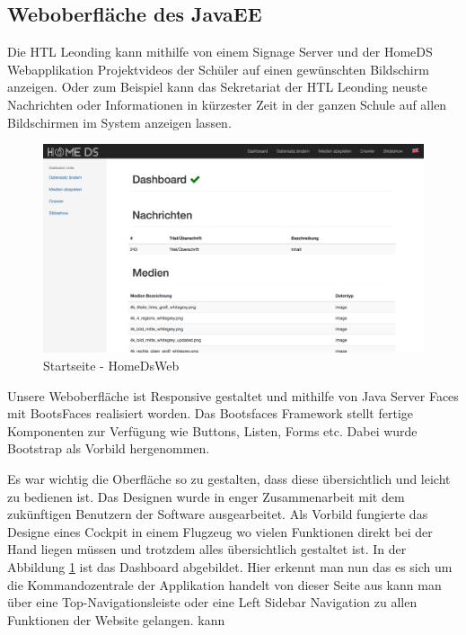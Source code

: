 \subsection{Weboberfläche des JavaEE}\label{sec:javaeejsf}
Die HTL Leonding kann mithilfe von einem Signage Server und der HomeDS Webapplikation Projektvideos der Schüler auf einen gewünschten Bildschirm anzeigen. Oder zum Beispiel kann das Sekretariat der HTL Leonding neuste Nachrichten oder Informationen in kürzester Zeit in der ganzen Schule auf allen Bildschirmen im System anzeigen lassen.

\begin{figure}[h]
\centering
\includegraphics[width=1\textwidth]{images/08_HomeDsWeb/DashboardHomeDsWeb.png}
\caption{Startseite - HomeDsWeb}
\label{img:Startseite}
\end{figure}

Unsere Weboberfläche ist Responsive gestaltet und mithilfe von Java Server Faces mit BootsFaces realisiert worden. Das Bootsfaces Framework stellt fertige Komponenten zur Verfügung wie Buttons, Listen, Forms etc. Dabei wurde Bootstrap als Vorbild hergenommen.

Es war wichtig die Oberfläche so zu gestalten, dass diese übersichtlich und leicht zu bedienen ist. Das Designen wurde in enger Zusammenarbeit mit dem zukünftigen Benutzern der Software ausgearbeitet. Als Vorbild fungierte das Designe eines Cockpit in einem Flugzeug wo vielen Funktionen direkt bei der Hand liegen müssen und trotzdem alles übersichtlich gestaltet ist. In der Abbildung \ref{img:Startseite} ist das Dashboard abgebildet. 
Hier erkennt man nun das es sich um die Kommandozentrale der Applikation handelt von dieser Seite aus kann man über eine Top-Navigationsleiste oder eine Left Sidebar Navigation zu allen Funktionen der Website gelangen. kann 

